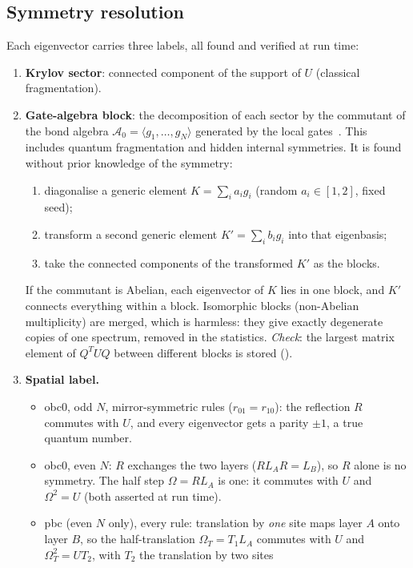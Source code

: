 \subsection{Symmetry resolution}
\label{sec:symres}
Each eigenvector carries three labels, all found and verified at run time:
\begin{enumerate}
\item \textbf{Krylov sector}: connected component of the support of $U$
  (classical fragmentation).
\item \textbf{Gate-algebra block}: the decomposition of each sector by the
  commutant of the bond algebra $\mathcal{A}_0=\langle g_1,\ldots,g_N\rangle$
  generated by the local gates~\cite{moudgalya2022}. This includes quantum
  fragmentation and hidden internal symmetries. It is found without prior
  knowledge of the symmetry:
  \begin{enumerate}
  \item diagonalise a generic element $K=\sum_ia_ig_i$ (random $a_i\in[1,2]$,
    fixed seed);
  \item transform a second generic element $K'=\sum_ib_ig_i$ into that
    eigenbasis;
  \item take the connected components of the transformed $K'$ as the blocks.
  \end{enumerate}
  If the commutant is Abelian, each eigenvector of $K$ lies in one block, and
  $K'$ connects everything within a block. Isomorphic blocks (non-Abelian
  multiplicity) are merged, which is harmless: they give exactly degenerate
  copies of one spectrum, removed in the statistics. \emph{Check}: the largest
  matrix element of $Q^TUQ$ between different blocks is stored
  ().
\item \textbf{Spatial label.}
  \begin{itemize}
  \item obc0, odd $N$, mirror-symmetric rules ($r_{01}=r_{10}$): the reflection $R$ commutes with $U$, and every
    eigenvector gets a parity $\pm1$, a true quantum number.
  \item obc0, even $N$: $R$ exchanges the two layers ($RL_AR=L_B$), so $R$ alone is no symmetry. The half step
    $\Omega=RL_A$ is one: it commutes with $U$ and $\Omega^2=U$ (both asserted at run time).
  \item pbc (even $N$ only), every rule: translation by \emph{one} site maps layer $A$ onto layer $B$, so the
    half-translation $\Omega_T=T_1L_A$ commutes with $U$ and $\Omega_T^2=UT_2$, with $T_2$ the translation by two sites

\end{itemize}
\end{enumerate}

